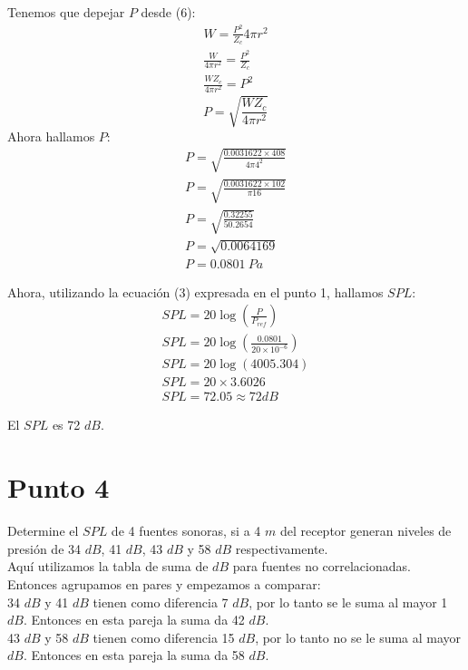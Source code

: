 \documentclass{article}
\begin{document}
Tenemos que depejar $P$ desde (6):
\begin{gather*}
    W = \frac{P^2}{Z_c} 4\pi r^2\\
    \frac{W}{4\pi r^2} = \frac{P^2}{Z_c}\\
    \frac{WZ_c}{4\pi r^2} = P^2
\end{gather*}
\begin{equation}
    P = \sqrt{\frac{WZ_c}{4\pi r^2}}
\end{equation}
Ahora hallamos $P$:
\begin{gather*}
    P = \sqrt{\frac{0.0031622 \times 408}{4\pi 4^2}}\\
    P = \sqrt{\frac{0.0031622 \times 102}{\pi 16}}\\
    P = \sqrt{\frac{0.32255}{50.2654}}\\
    P = \sqrt{0.0064169}\\
    P = 0.0801\ Pa
\end{gather*}

Ahora, utilizando la ecuación (3) expresada en el punto 1, hallamos $SPL$:
\begin{gather*}
    SPL = 20 \log(\frac{P}{P_{ref}})\\
    SPL = 20 \log(\frac{0.0801}{20 \times 10^{-6}})\\
    SPL = 20 \log(4005.304)\\
    SPL = 20 \times 3.6026\\
    SPL = 72.05 \approx 72 dB
\end{gather*}

El $SPL$ es 72 $dB$.

\section{Punto 4}

Determine el $SPL$ de 4 fuentes sonoras, si a 4 $m$ del receptor generan niveles de presión de 34 $dB$, 41 $dB$, 43 $dB$ y 58 $dB$ respectivamente.\\

Aquí utilizamos la tabla de suma de $dB$ para fuentes no correlacionadas. Entonces agrupamos en pares y empezamos a comparar:\\

34 $dB$ y 41 $dB$ tienen como diferencia 7 $dB$, por lo tanto se le suma al mayor 1 $dB$. Entonces en esta pareja la suma da 42 $dB$.\\

43 $dB$ y 58 $dB$ tienen como diferencia 15 $dB$, por lo tanto no se le suma al mayor $dB$. Entonces en esta pareja la suma da 58 $dB$.\\
\end{document}
